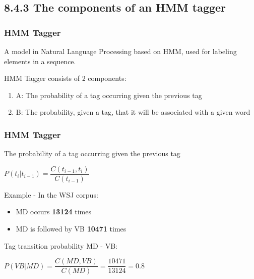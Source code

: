 \documentclass[13.5pt,aspecratio=169]{beamer}
\begin{document}
\subsection{8.4.3 The components of an HMM tagger}
\begin{frame}
    \onehalfspacing
        \frametitle{HMM Tagger}
        \begin{block}{}
            A model in Natural Language Processing based on HMM, used for labeling elements in a sequence.
        \end{block}
        HMM Tagger consists of 2 components:
        \begin{enumerate}
            \item A: The probability of a tag occurring given the previous tag
            \item B: The probability, given a tag, that it will be associated with a given word
        \end{enumerate}
    \end{frame}
\begin{frame}
\onehalfspacing
	\frametitle{HMM Tagger}
    {\Large The probability of a tag occurring given the previous tag
    \begin{center}
        $P(t_i | t_{i-1}) = \dfrac{C(t_{i-1}, t_i)}{C(t_{i-1})}$
    \end{center}}

    {
        \begin{block}{Example - In the WSJ corpus:}
            \begin{itemize}
                \item MD occurs \textbf{13124} times
                \item MD is followed
                by VB \textbf{10471} times
            \end{itemize}
            Tag transition probability MD - VB:
            \begin{center}
                $ P(VB | MD) = \dfrac{C(MD, VB)}{C(MD)} = \dfrac{10471}{13124} = 0.8 $
            \end{center}
        \end{block}
    }
\end{frame}
\end{document}
